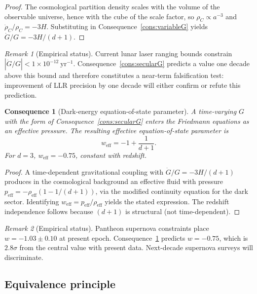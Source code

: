 \documentclass[11pt,twocolumn,a4paper]{article}
\theoremstyle{axiomstyle}
\theoremstyle{conseqstyle}
\newtheorem{consequence}{Consequence}
\theoremstyle{definition}
\theoremstyle{remark}
\newtheorem*{remark}{Remark}
\begin{document}
\begin{proof}
The cosmological partition density scales with the volume of the observable universe, hence with the cube of the scale factor, so $\rho_{C}\propto a^{-3}$ and $\dot\rho_{C}/\rho_{C}=-3H$. Substituting in Consequence~\ref{cons:variableG} yields $\dot G/G=-3H/(d+1)$.
\end{proof}

\begin{remark}[Empirical status]
Current lunar laser ranging bounds \citep{hofmann2010} constrain $|\dot G/G|<1\times10^{-12}~\mathrm{yr}^{-1}$. Consequence~\ref{cons:secularG} predicts a value one decade above this bound and therefore constitutes a near-term falsification test: improvement of LLR precision by one decade will either confirm or refute this prediction.
\end{remark}

\begin{consequence}[Dark-energy equation-of-state parameter]\label{cons:darkenergy}
A time-varying $G$ with the form of Consequence~\ref{cons:secularG} enters the Friedmann equations as an effective pressure. The resulting effective equation-of-state parameter is
\begin{equation}
w_{\mathrm{eff}}=-1+\frac{1}{d+1}.
\end{equation}
For $d=3$, $w_{\mathrm{eff}}=-0.75$, constant with redshift.
\end{consequence}

\begin{proof}
A time-dependent gravitational coupling with $\dot G/G=-3H/(d+1)$ produces in the cosmological background an effective fluid with pressure $p_{\mathrm{eff}}=-\rho_{\mathrm{eff}}(1-1/(d+1))$, via the modified continuity equation for the dark sector. Identifying $w_{\mathrm{eff}}=p_{\mathrm{eff}}/\rho_{\mathrm{eff}}$ yields the stated expression. The redshift independence follows because $(d+1)$ is structural (not time-dependent).
\end{proof}

\begin{remark}[Empirical status]
Pantheon supernova constraints \citep{scolnic2018} place $w=-1.03\pm0.10$ at present epoch. Consequence~\ref{cons:darkenergy} predicts $w=-0.75$, which is $2.8\sigma$ from the central value with present data. Next-decade supernova surveys will discriminate.
\end{remark}

\subsection{Equivalence principle}
\end{document}

